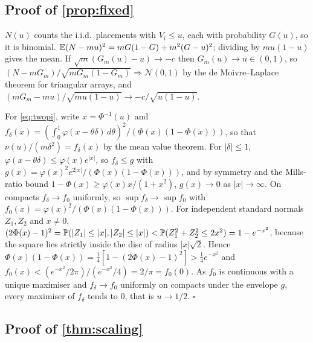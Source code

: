 \subsection{Proof of \texorpdfstring{\cref{prop:fixed}}{Proposition 3}}\label{app:proof-fixed}

$N(u)$ counts the i.i.d.\ placements with $V_i \le u$, each with probability $G(u)$, so it is binomial. $\E(N - mu)^2 = mG(1-G) + m^2(G-u)^2$; dividing by $mu(1-u)$ gives the mean. If $\sqrt m(G_m(u) - u) \to -c$ then $G_m(u)\to u \in (0,1)$, so $(N - mG_m)/\sqrt{mG_m(1-G_m)} \Rightarrow \mathcal N(0,1)$ by the de Moivre--Laplace theorem for triangular arrays, and $(mG_m - mu)/\sqrt{mu(1-u)} \to -c/\sqrt{u(1-u)}$.

For \eqref{eq:twopi}, write $x = \Phi^{-1}(u)$ and $f_\delta(x) = (\int_0^1\varphi(x-\theta\delta)\,d\theta)^2/(\Phi(x)(1-\Phi(x)))$, so that $\nu(u)/(m\delta^2) = f_\delta(x)$ by the mean value theorem. For $|\delta|\le 1$, $\varphi(x-\theta\delta) \le \varphi(x)e^{|x|}$, so $f_\delta \le g$ with $g(x) = \varphi(x)^2e^{2|x|}/(\Phi(x)(1-\Phi(x)))$, and by symmetry and the Mills-ratio bound $1-\Phi(x) \ge \varphi(x)x/(1+x^2)$, $g(x)\to 0$ as $|x|\to\infty$. On compacts $f_\delta \to f_0$ uniformly, so $\sup f_\delta \to \sup f_0$ with $f_0(x) = \varphi(x)^2/(\Phi(x)(1-\Phi(x)))$. For independent standard normals $Z_1, Z_2$ and $x\neq 0$, $(2\Phi(x)-1)^2 = \P(|Z_1|\le|x|, |Z_2|\le|x|) < \P(Z_1^2+Z_2^2 \le 2x^2) = 1 - e^{-x^2}$, because the square lies strictly inside the disc of radius $|x|\sqrt2$. Hence $\Phi(x)(1-\Phi(x)) = \frac14[1-(2\Phi(x)-1)^2] > \frac14 e^{-x^2}$ and $f_0(x) < (e^{-x^2}/2\pi)/(e^{-x^2}/4) = 2/\pi = f_0(0)$. As $f_0$ is continuous with a unique maximiser and $f_\delta\to f_0$ uniformly on compacts under the envelope $g$, every maximiser of $f_\delta$ tends to $0$, that is $u\to 1/2$. \hfill$\square$

\subsection{Proof of \texorpdfstring{\cref{thm:scaling}}{Theorem 2}}\label{app:proof-scaling}

